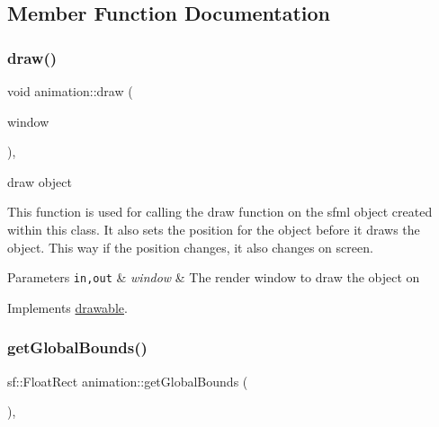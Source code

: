 \subsection{Member Function Documentation}
\mbox{\label{classanimation_a20959b66d1c25007890bb40f0e876570}} 
\subsubsection{\texorpdfstring{draw()}{draw()}}
{\footnotesize\ttfamily void animation\+::draw (\begin{DoxyParamCaption}\item[{sf\+::\+Render\+Window \&}]{window }\end{DoxyParamCaption})\hspace{0.3cm}{\ttfamily [override]}, {\ttfamily [virtual]}}



draw object 

This function is used for calling the draw function on the sfml object created within this class. It also sets the position for the object before it draws the object. This way if the position changes, it also changes on screen.


\begin{DoxyParams}[1]{Parameters}
\mbox{\tt in,out}  & {\em window} & The render window to draw the object on \\
\hline
\end{DoxyParams}


Implements \hyperlink{classdrawable_a4e49e2c1121704c83ce24c5f48dd910f}{drawable}.

\mbox{\label{classanimation_aae3322323bf3dea83723969f364e18e0}} 
\subsubsection{\texorpdfstring{get\+Global\+Bounds()}{getGlobalBounds()}}
{\footnotesize\ttfamily sf\+::\+Float\+Rect animation\+::get\+Global\+Bounds (\begin{DoxyParamCaption}{ }\end{DoxyParamCaption})\hspace{0.3cm}{\ttfamily [override]}, {\ttfamily [virtual]}}



